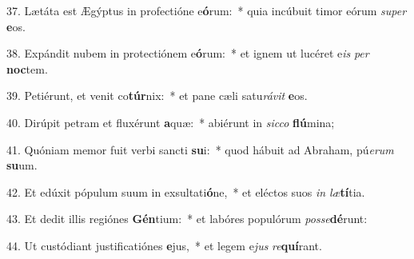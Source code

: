 37. Lætáta est Ægýptus in profectióne e\textbf{ó}rum:~*  quia incúbuit timor eórum \textit{su}\textit{per} \textbf{e}os.\

38. Expándit nubem in protectiónem e\textbf{ó}rum:~*  et ignem ut lucéret e\textit{is} \textit{per} \textbf{noc}tem.\

39. Petiérunt, et venit co\textbf{túr}nix:~*  et pane cæli satu\textit{rá}\textit{vit} \textbf{e}os.\

40. Dirúpit petram et fluxérunt \textbf{a}quæ:~*  abiérunt in \textit{sic}\textit{co} \textbf{flú}mina;\

41. Quóniam memor fuit verbi sancti \textbf{su}i:~*  quod hábuit ad Abraham, pú\textit{e}\textit{rum} \textbf{su}um.\

42. Et edúxit pópulum suum in exsultati\textbf{ó}ne,~*  et eléctos suos \textit{in} \textit{læ}\textbf{tí}tia.\

43. Et dedit illis regiónes \textbf{Gén}tium:~*  et labóres populórum \textit{pos}\textit{se}\textbf{dé}runt:\

44. Ut custódiant justificatiónes \textbf{e}jus,~*  et legem e\textit{jus} \textit{re}\textbf{quí}rant.\

